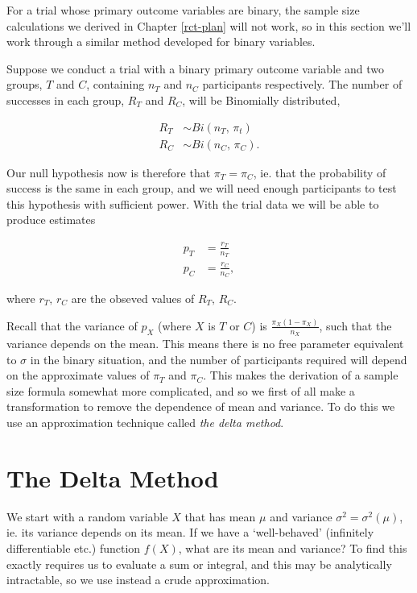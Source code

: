 \documentclass[
  openany]{book}
\theoremstyle{definition}
\theoremstyle{definition}
\theoremstyle{definition}
\theoremstyle{definition}
\theoremstyle{remark}
\begin{document}
For a trial whose primary outcome variables are binary, the sample size calculations we derived in Chapter \ref{rct-plan} will not work, so in this section we'll work through a similar method developed for binary variables.

Suppose we conduct a trial with a binary primary outcome variable and two groups, \(T\) and \(C\), containing \(n_T\) and \(n_C\) participants respectively. The number of successes in each group, \(R_T\) and \(R_C\), will be Binomially distributed,

\begin{align*}
      R_T &\sim{Bi\left(n_T,\, \pi_t\right)} \\
      R_C &\sim{Bi\left(n_C,\,\pi_C\right)}.
\end{align*}

Our null hypothesis now is therefore that \(\pi_T = \pi_C\), ie. that the probability of success is the same in each group, and we will need enough participants to test this hypothesis with sufficient power. With the trial data we will be able to produce estimates

\begin{align*}
      p_T & = \frac{r_T}{n_T} \\
      p_C & = \frac{r_C}{n_C},
\end{align*}

where \(r_T,\,r_C\) are the obseved values of \(R_T,\,R_C.\)

Recall that the variance of \(p_X\) (where \(X\) is \(T\) or \(C\)) is \(\frac{\pi_X\left(1-\pi_X\right)}{n_X}\), such that the variance depends on the mean. This means there is no free parameter equivalent to \(\sigma\) in the binary situation, and the number of participants required will depend on the approximate values of \(\pi_T\) and \(\pi_C\). This makes the derivation of a sample size formula somewhat more complicated, and so we first of all make a transformation to remove the dependence of mean and variance. To do this we use an approximation technique called \emph{the delta method}.

\section{The Delta Method}\label{delta-method}

We start with a random variable \(X\) that has mean \(\mu\) and variance \(\sigma^2 = \sigma^2\left(\mu\right)\), ie. its variance depends on its mean. If we have a `well-behaved' (infinitely differentiable etc.) function \(f\left(X\right)\), what are its mean and variance? To find this exactly requires us to evaluate a sum or integral, and this may be analytically intractable, so we use instead a crude approximation.
\end{document}
